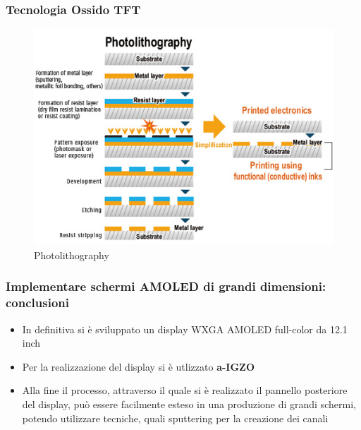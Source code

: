 \documentclass[12pt]{beamer}
\begin{document}
	\begin{frame}
		\frametitle{Tecnologia Ossido TFT}
		\begin{figure}
			\centering
			\includegraphics[width=0.9\linewidth]{IMMAGINI/photolitography}
			\caption{Photolithography}
			\label{fig:photolitography}
		\end{figure}
	\end{frame}	
	\begin{frame}
		\frametitle{Implementare schermi AMOLED di grandi dimensioni: conclusioni}
		\begin{itemize}
			\item In definitiva si è sviluppato un display WXGA AMOLED full-color da 12.1 inch
			\pause
			\item Per la realizzazione del display si è utlizzato \textbf{a-IGZO}
			\pause
			\item Alla fine il processo, attraverso il quale si è realizzato il pannello posteriore del display, può essere facilmente esteso in una produzione di grandi schermi, potendo utilizzare tecniche, quali sputtering per la creazione dei canali 
		\end{itemize}
	\end{frame}
\end{document}
